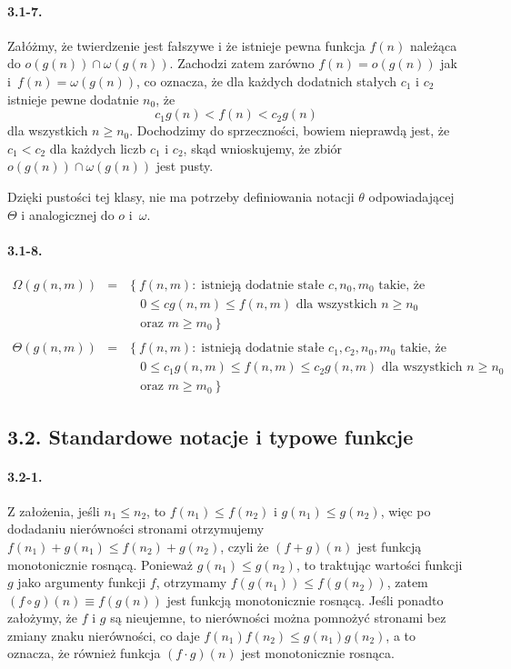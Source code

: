 \paragraph{3.1-7.}
Załóżmy, że twierdzenie jest fałszywe i że istnieje pewna funkcja $f(n)$ należąca do $o(g(n))\cap\omega(g(n))$. Zachodzi zatem zarówno $f(n)=o(g(n))$ jak i~$f(n)=\omega(g(n))$, co oznacza, że dla każdych dodatnich stałych $c_1$ i $c_2$ istnieje pewne dodatnie $n_0$, że
\[
  c_1g(n)<f(n)<c_2g(n)
\]
dla wszystkich $n\ge n_0$. Dochodzimy do sprzeczności, bowiem nieprawdą jest, że $c_1<c_2$ dla każdych liczb $c_1$ i $c_2$, skąd wnioskujemy, że zbiór $o(g(n))\cap\omega(g(n))$ jest pusty.

Dzięki pustości tej klasy, nie ma potrzeby definiowania notacji $\theta$ odpowiadającej $\Theta$ i analogicznej do $o$ i~$\omega$.

\paragraph{3.1-8.}
\begin{eqnarray*}
  \Omega(g(n,m)) &=& \left\{f(n,m):\;\mbox{istnieją dodatnie stałe }c,n_0,m_0\mbox{ takie, że}\right. \\
  && \quad 0\le cg(n,m)\le f(n,m)\mbox{ dla wszystkich }n\ge n_0 \\
  && \left.\quad\mbox{oraz }m\ge m_0\right\} \\\\
  \Theta(g(n,m)) &=& \left\{f(n,m):\;\mbox{istnieją dodatnie stałe }c_1,c_2,n_0,m_0\mbox{ takie, że}\right. \\
  && \quad 0\le c_1g(n,m)\le f(n,m)\le c_2g(n,m)\mbox{ dla wszystkich }n\ge n_0 \\
  && \left.\quad\mbox{oraz }m\ge m_0\right\}
\end{eqnarray*}

\subsection*{3.2. Standardowe notacje i typowe funkcje}

\paragraph{3.2-1.}
Z założenia, jeśli $n_1\le n_2$, to $f(n_1)\le f(n_2)$ i $g(n_1)\le g(n_2)$, więc po dodadaniu nierówności stronami otrzymujemy $f(n_1)+g(n_1)\le f(n_2)+g(n_2)$, czyli że $(f+g)(n)$ jest funkcją monotonicznie rosnącą. Ponieważ $g(n_1)\le g(n_2)$, to traktując wartości funkcji $g$ jako argumenty funkcji $f$, otrzymamy $f(g(n_1))\le f(g(n_2))$, zatem $(f\circ g)(n)\equiv f(g(n))$ jest funkcją monotonicznie rosnącą. Jeśli ponadto założymy, że $f$ i $g$ są nieujemne, to nierówności można pomnożyć stronami bez zmiany znaku nierówności, co daje $f(n_1)f(n_2)\le g(n_1)g(n_2)$, a to oznacza, że również funkcja $(f\cdot g)(n)$ jest monotonicznie rosnąca.

